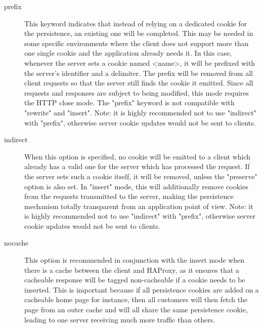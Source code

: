 \begin{description}
  \item[prefix]
              This keyword indicates that instead of relying on a dedicated
              cookie for the persistence, an existing one will be completed.
              This may be needed in some specific environments where the client
              does not support more than one single cookie and the application
              already needs it. In this case, whenever the server sets a cookie
              named <name>, it will be prefixed with the server's identifier
              and a delimiter. The prefix will be removed from all client
              requests so that the server still finds the cookie it emitted.
              Since all requests and responses are subject to being modified,
              this mode requires the HTTP close mode. The "prefix" keyword is
              not compatible with "rewrite" and "insert". Note: it is highly
              recommended not to use "indirect" with "prefix", otherwise server
              cookie updates would not be sent to clients.

  \item[indirect]
              When this option is specified, no cookie will be emitted to a
              client which already has a valid one for the server which has
              processed the request. If the server sets such a cookie itself,
              it will be removed, unless the "preserve" option is also set. In
              "insert" mode, this will additionally remove cookies from the
              requests transmitted to the server, making the persistence
              mechanism totally transparent from an application point of view.
              Note: it is highly recommended not to use "indirect" with
              "prefix", otherwise server cookie updates would not be sent to
              clients.

  \item[nocache]
              This option is recommended in conjunction with the insert mode
              when there is a cache between the client and HAProxy, as it
              ensures that a cacheable response will be tagged non-cacheable if
              a cookie needs to be inserted. This is important because if all
              persistence cookies are added on a cacheable home page for
              instance, then all customers will then fetch the page from an
              outer cache and will all share the same persistence cookie,
              leading to one server receiving much more traffic than others.


\end{description}
